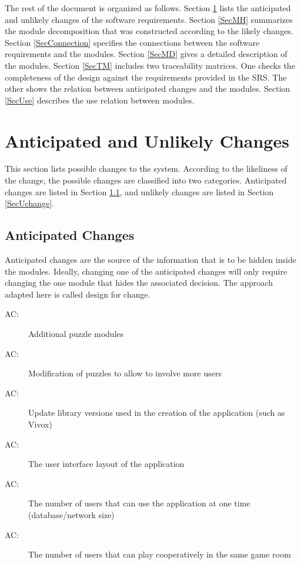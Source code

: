 \documentclass[12pt, titlepage]{article}
\newcounter{acnum}
\newcommand{\actheacnum}{AC\theacnum}
\begin{document}
The rest of the document is organized as follows. Section
\ref{SecChange} lists the anticipated and unlikely changes of the software
requirements. Section \ref{SecMH} summarizes the module decomposition that
was constructed according to the likely changes. Section \ref{SecConnection}
specifies the connections between the software requirements and the
modules. Section \ref{SecMD} gives a detailed description of the
modules. Section \ref{SecTM} includes two traceability matrices. One checks
the completeness of the design against the requirements provided in the SRS. The
other shows the relation between anticipated changes and the modules. Section
\ref{SecUse} describes the use relation between modules.

\section{Anticipated and Unlikely Changes} \label{SecChange}

This section lists possible changes to the system. According to the likeliness
of the change, the possible changes are classified into two
categories. Anticipated changes are listed in Section \ref{SecAchange}, and
unlikely changes are listed in Section \ref{SecUchange}.

\subsection{Anticipated Changes} \label{SecAchange}

Anticipated changes are the source of the information that is to be hidden
inside the modules. Ideally, changing one of the anticipated changes will only
require changing the one module that hides the associated decision. The approach
adapted here is called design for
change.

\begin{description}
\item[ \actheacnum \label{acInput2}:] Additional puzzle modules
\item[ \actheacnum \label{acInput3}:] Modification of puzzles to allow to involve more users
\item[ \actheacnum \label{acInput4}:] Update library versions used in the creation of the application (such as Vivox)
\item[ \actheacnum \label{acInput5}:] The user interface layout of the application
\item[ \actheacnum \label{acInput6}:] The number of users that can use the application at one time (database/network size)
\item[ \actheacnum \label{acInput7}:] The number of users that can play cooperatively in the same game room
\end{description}
\end{document}

